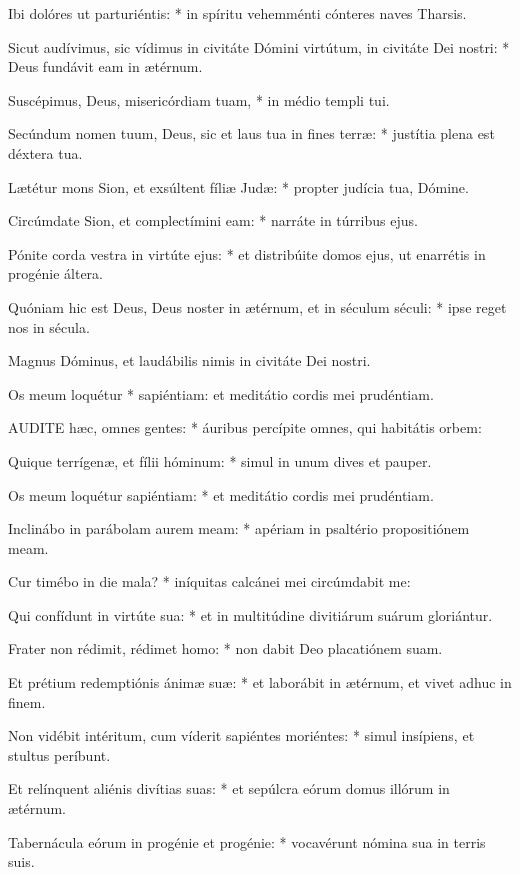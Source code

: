 Ibi dolóres ut parturiéntis: * in spíritu vehemménti cónteres naves Tharsis.

Sicut audívimus, sic vídimus in civitáte Dómini virtútum, in civitáte Dei nostri: * Deus fundávit eam in ætérnum.

Suscépimus, Deus, misericórdiam tuam, * in médio templi tui.

Secúndum nomen tuum, Deus, sic et laus tua in fines terræ: * justítia plena est déxtera tua.

Lætétur mons Sion, et exsúltent fíliæ Judæ: * propter judícia tua, Dómine.

Circúmdate Sion, et complectímini eam: * narráte in túrribus ejus.

Pónite corda vestra in virtúte ejus: * et distribúite domos ejus, ut enarrétis in progénie áltera.

Quóniam hic est Deus, Deus noster in ætérnum, et in séculum séculi: * ipse reget nos in sécula.

 Magnus Dóminus, et laudábilis nimis in civitáte Dei nostri.

 Os meum loquétur * sapiéntiam: et meditátio cordis mei prudéntiam.


\lettrine[lines=2]{A}{UDITE} hæc, omnes gentes: * áuribus percípite omnes, qui habitátis orbem:

Quique terrígenæ, et fílii hóminum: * simul in unum dives et pauper.

Os meum loquétur sapiéntiam: * et meditátio cordis mei prudéntiam.

Inclinábo in parábolam aurem meam: * apériam in psaltério propositiónem meam.

Cur timébo in die mala? * iníquitas calcánei mei circúmdabit me:

Qui confídunt in virtúte sua: * et in multitúdine divitiárum suárum gloriántur.

Frater non rédimit, rédimet homo: * non dabit Deo placatiónem suam.

Et prétium redemptiónis ánimæ suæ: * et laborábit in ætérnum, et vivet adhuc in finem.

Non vidébit intéritum, cum víderit sapiéntes moriéntes: * simul insípiens, et stultus períbunt.

Et relínquent aliénis divítias suas: * et sepúlcra eórum domus illórum in ætérnum.

Tabernácula eórum in progénie et progénie: * vocavérunt nómina sua in terris suis.

